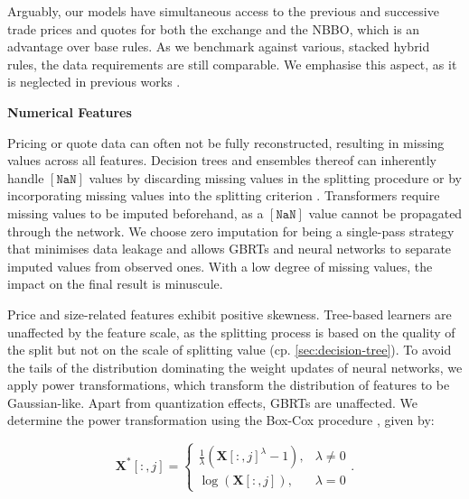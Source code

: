Arguably, our models have simultaneous access to the previous and successive trade prices and quotes for both the exchange and the \gls{NBBO}, which is an advantage over base rules. As we benchmark against various, stacked hybrid rules, the data requirements are still comparable. We emphasise this aspect, as it is neglected in previous works \autocites[][485]{blazejewskiLocalNonParametricModel2005}[][48]{ronenMachineLearningTrade2022}[][9]{rosenthalModelingTradeDirection2012}.

\textbf{Numerical Features}

Pricing or quote data can often not be fully reconstructed, resulting in missing values across all features. Decision trees and ensembles thereof can inherently handle $\mathtt{[NaN]}$ values by discarding missing values in the splitting procedure \autocite[][150--152]{breimanClassificationRegressionTrees2017} or by incorporating missing values into the splitting criterion \autocite[][951]{twalaGoodMethodsCoping2008}. Transformers require missing values to be imputed beforehand, as a $\mathtt{[NaN]}$ value cannot be propagated through the network. We choose zero imputation for being a single-pass strategy that minimises data leakage and allows \glspl{GBRT} and neural networks to separate imputed values from observed ones. With a low degree of missing values, the impact on the final result is minuscule.

Price and size-related features exhibit positive skewness. Tree-based learners are unaffected by the feature scale, as the splitting process is based on the quality of the split but not on the scale of splitting value (cp. \cref{sec:decision-tree}). To avoid the tails of the distribution dominating the weight updates of neural networks, we apply power transformations, which transform the distribution of features to be Gaussian-like. Apart from quantization effects, \glspl{GBRT} are unaffected. We determine the power transformation using the Box-Cox procedure \autocite[][214]{boxAnalysisTransformations2022}, given by:

\begin{equation}
    \mathbf{X}^{*}\left[:,j\right]= \begin{cases}\frac{1}{\lambda}(\mathbf{X}\left[:,j\right]^\lambda-1), & \lambda \neq 0 \\ \log (\mathbf{X}\left[:,j\right]),& \lambda=0\end{cases}.
    \label{eq:box-cox-test}
\end{equation}

